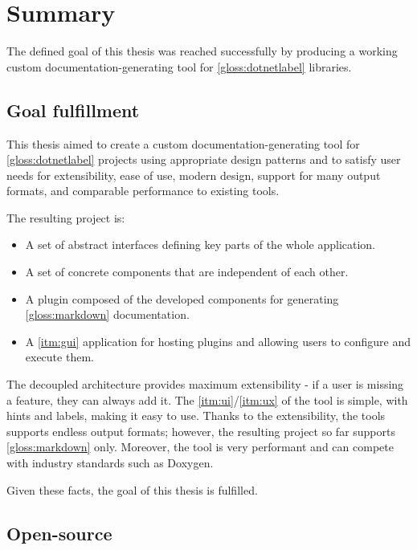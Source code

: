 \chapter*{Summary}

The defined goal of this thesis was reached successfully by producing a working custom documentation-generating tool for \ref{gloss:dotnetlabel} libraries.

\section*{Goal fulfillment}

This thesis aimed to create a custom documentation-generating tool for \ref{gloss:dotnetlabel} projects using appropriate design patterns \cite{humblot_design_2021} and to satisfy user needs for extensibility, ease of use, modern design, support for many output formats, and comparable performance to existing tools.

The resulting project is:
\begin{itemize}
    \item A set of abstract interfaces defining key parts of the whole application.
    \item A set of concrete components that are independent of each other.
    \item A plugin composed of the developed components for generating \ref{gloss:markdown} documentation.
    \item A \ref{itm:gui} application for hosting plugins and allowing users to configure and execute them.
\end{itemize}

The decoupled architecture provides maximum extensibility - if a user is missing a feature, they can always add it. The \ref{itm:ui}/\ref{itm:ux} of the tool is simple, with hints and labels, making it easy to use. Thanks to the extensibility, the tools supports endless output formats; however, the resulting project so far supports \ref{gloss:markdown} only. Moreover, the tool is very performant and can compete with industry standards such as Doxygen.

Given these facts, the goal of this thesis is fulfilled.

\section*{Open-source} \label{sec:openSource}

